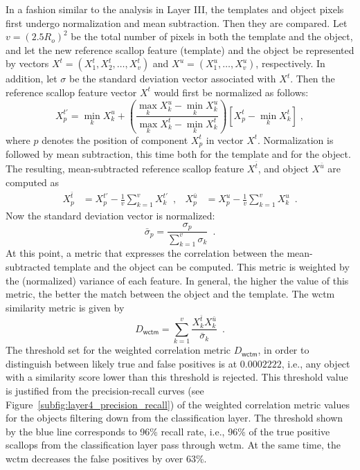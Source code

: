 \documentclass {udthesis}
\begin{document}
In a fashion similar to the analysis in Layer III, the templates and object pixels first undergo normalization and mean subtraction.
Then they are compared.
Let $v=(2.5R_o)^2$ be the total number of pixels in both the template and the object, and let the new reference scallop feature (template) and the object be represented by vectors $X^t=(X^t_1,X^t_2, \ldots,X^t_{v})$ and $X^u=(X^u_1,\ldots,X^u_{v})$, respectively. 
In addition, let $\sigma$ be the standard deviation vector associated with $X^t$.
Then the reference scallop feature vector $X^t$ would first be normalized as follows: 
%
\[
X^{t'}_p = \min_{k} X^u_k + \left(\frac{\max \limits_{k} X^u_k-\min \limits_{k} X^u_k}{\max \limits_{k} X^{t}_k-\min \limits _{k} X^{t}_k}
\right)\left[ X^{t}_p-\min_{k} X^{t}_k \right] \; ,
\]
%
where $p$ denotes the position of component $X^t_p$ in vector $X^t$.
Normalization is followed by mean subtraction, this time both for the template and for the object. 
The resulting, mean-subtracted reference scallop feature $X^{\bar{t}}$, and object $X^{\bar{u}}$ are computed as
%
\begin{align*}
X^{\bar{t}}_p &= X^{t'}_p-\frac{1}{v}\sum_{k=1}^{v}X^{t'}_k \enspace,& 
X^{\bar{u}}_p &= X^{u}_p-\frac{1}{v}\sum_{k=1}^{v}X^{u}_k \enspace.
\end{align*}
%
Now the standard deviation vector is normalized:
%
\[
\bar{\sigma}_p = \frac{\sigma_p}{\sum_{k=1}^{v}\sigma_k} \enspace.
\]
%
At this point, a metric that expresses the correlation between the mean-subtracted template and the object can be computed.
This metric is weighted by the (normalized) variance of each feature. 
In general, the higher the value of this metric, the better the match between the object and the template. 
The \gls{wctm} similarity metric is given by
%
\[
D_\mathsf{wctm} = \sum_{k=1}^v\frac{X^{\bar{t}}_{k}X^{\bar{u}}_k}{\bar{\sigma}_{k}} \enspace .
\]
%
The threshold set for the weighted correlation metric $D_\mathsf{wctm}$, in order to distinguish between likely true and false positives is at $0.0002222$, i.e., any object with a similarity score lower than this threshold is rejected. 
This threshold value is justified from the precision-recall curves (see Figure~\ref{subfig:layer4_precision_recall}) of the weighted correlation metric values for the objects filtering down from the classification layer. 
The threshold shown by the blue line corresponds to 96\% recall rate, i.e., 96\% of the true positive scallops from the classification layer pass through \gls{wctm}. 
At the same time, the \gls{wctm} decreases the false positives by over 63\%.
\end{document}
